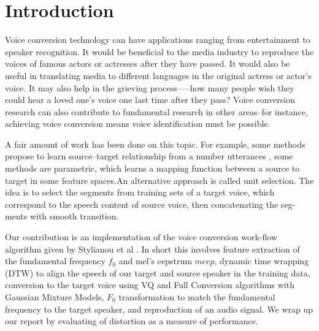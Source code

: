 \section{Introduction}
\label{sec:intro}
Voice conversion technology can have applications ranging from entertainment to speaker recognition. It would be beneficial to the media industry to reproduce the voices of famous actors or actresses after they have passed. It would also be useful in translating media to different languages in the original actress or actor's voice. It may also help in the grieving process—--how many people wish they could hear a loved one’s voice one last time after they pass? Voice conversion research can also contribute to fundamental research in other areas--for instance, achieving voice conversion means voice identification must be possible.

A fair amount of work has been done on this topic. For example, some methods propose to learn source--target relationship from a number utterances \cite{stylianou2009voice}, some methods are parametric, which learns a mapping function between a source to target in some feature spaces\cite{stylianou1998continuous}\cite{kawahara1997speech}.An alternative approach is called unit selection\cite{duxans2006voice}\cite{jin2016cute}. The idea is to select the segments from training sets of a target voice, which correspond to the speech content of source voice, then concatenating the seg- ments with smooth transition.

Our contribution is an implementation of the voice conversion work-flow algorithm given by Stylianou et al \cite{stylianou1998continuous}. In short this involves feature extraction of the fundamental frequency $f_0$ and mel's cepstrum $mcep$, dynamic time wrapping (DTW) to align the speech of our target and source speaker in the training data, conversion to the target voice using VQ and Full Conversion algorithms with Gaussian Mixture Models, $F_0$ transformation to match the fundamental frequency to the target speaker, and reproduction of an audio signal. We wrap up our report by evaluating of distortion as a measure of performance. 

